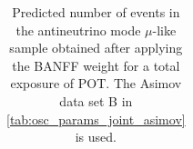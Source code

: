 \begin{table}
\begin{tabular} { | l ||r | r | r | r | r | r | | r | }
\end{tabular}
\caption{
Predicted number of events in the antineutrino mode $\mu$-like sample
obtained after applying the BANFF weight
for a total exposure of \TotalPotNuBarRunOneSevenB{} POT.
The Asimov data set B in \cref{tab:osc_params_joint_asimov} is used.
}
\label{tab:events_rhc1rmu_Asimov_B_Run17b}
\end{table}


